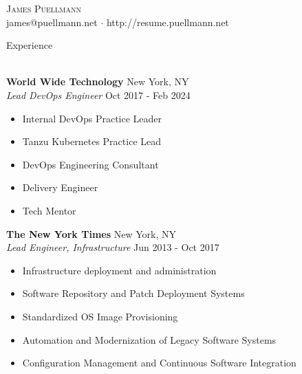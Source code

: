 \documentclass[letterpaper]{article}
\newcommand{\lineunder} {
    \vspace*{-8pt} \\
    \hspace*{-18pt} \hrulefill \\
}
\newcommand{\header} [1] {
    {\hspace*{-18pt}\vspace*{6pt} #1}
    \vspace*{-6pt} \lineunder
}
\begin{document}
\vspace*{-40pt}

    

\vspace*{-10pt}
\begin{center}
	{\Huge \scshape {James Puellmann}}\\
	james@puellmann.net $\cdot$ http://resume.puellmann.net\\
\end{center}

\header{Experience}
\vspace{1mm}

\textbf{World Wide Technology} \hfill New York, NY\\
\textit{Lead DevOps Engineer} \hfill Oct 2017 - Feb 2024\\
\vspace{-1mm}
\begin{itemize} \itemsep 1pt
	\item Internal DevOps Practice Leader
	\item Tanzu Kubernetes Practice Lead
	\item DevOps Engineering Consultant
	\item Delivery Engineer
	\item Tech Mentor
\end{itemize}

\textbf{The New York Times} \hfill New York, NY\\
\textit{Lead Engineer, Infrastructure} \hfill Jun 2013 - Oct 2017\\
\vspace{-1mm}
\begin{itemize} \itemsep 1pt
	\item Infrastructure deployment and administration
	\item Software Repository and Patch Deployment Systems
	\item Standardized OS Image Provisioning
	\item Automation and Modernization of Legacy Software Systems
	\item Configuration Management and Continuous Software Integration
\end{itemize}
\end{document}
